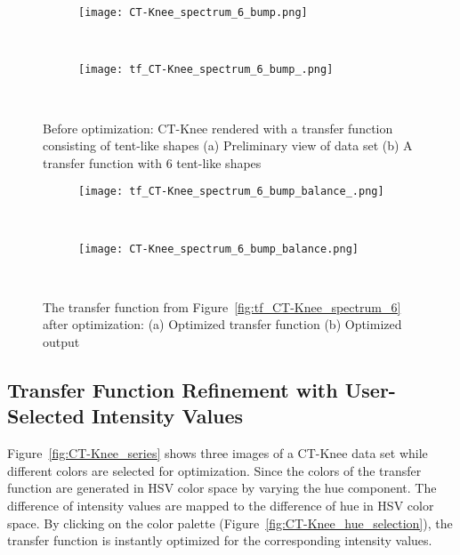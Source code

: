 \begin{figure}
\centering

\begin{subfigure}{0.15\textwidth}
\texttt{[image: CT-Knee\_spectrum\_6\_bump.png]}
\caption{~}
\end{subfigure}
\begin{subfigure}{0.15\textwidth}
\texttt{[image: tf\_CT-Knee\_spectrum\_6\_bump\_.png]}
\caption{~}
\label{fig:tf_CT-Knee_spectrum_6_bump_}
\end{subfigure}
\caption{Before optimization: CT-Knee rendered with a transfer function consisting 
of tent-like shapes (a) Preliminary view of data set (b) A transfer function with 6 tent-like shapes}
\label{fig:tf_CT-Knee_spectrum_6}

\begin{subfigure}{0.15\textwidth}
\texttt{[image: tf\_CT-Knee\_spectrum\_6\_bump\_balance\_.png]}
\caption{~}
\end{subfigure}
\begin{subfigure}{0.15\textwidth}
\texttt{[image: CT-Knee\_spectrum\_6\_bump\_balance.png]}
\caption{~}
\end{subfigure}
\caption{The transfer function from Figure~\ref{fig:tf_CT-Knee_spectrum_6} after optimization: (a) Optimized transfer function (b) Optimized output}
\label{fig:tf_CT-Knee_spectrum_6_balance_1000}
\end{figure}

\subsection{Transfer Function Refinement with User-Selected Intensity Values}
Figure~\ref{fig:CT-Knee_series} shows three images of a CT-Knee data set while different colors are selected for optimization. Since the colors of the transfer function are generated in HSV color space by varying the hue component. The difference of intensity values are mapped to the difference of hue in HSV color space. By clicking on the color palette (Figure~\ref{fig:CT-Knee_hue_selection}), the transfer function is instantly optimized for the corresponding intensity values.

